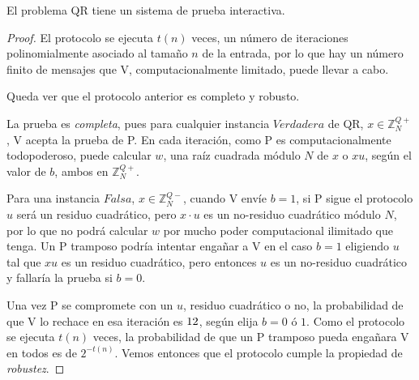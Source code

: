 \hfil


\begin{theorem}
	El problema QR tiene un sistema de prueba interactiva.
	\label{theo:QRint}
\end{theorem}

\begin{proof}
	
	El protocolo se ejecuta $t(n)$ veces, un número de iteraciones polinomialmente asociado al tamaño $n$ de la entrada, por lo que hay un número finito de mensajes que V, computacionalmente limitado, puede llevar a cabo. 
	
	\hfil 
	
	Queda ver que el protocolo anterior es completo y robusto.
	
	La prueba es \textit{completa}, pues para cualquier instancia $Verdadera$ de QR, $x \in \mathbb{Z}^{Q+}_N$, V acepta la prueba de P. En cada iteración, como P es computacionalmente todopoderoso, puede calcular $w$, una raíz cuadrada módulo $N$ de $x$ o $xu$, según el valor de $b$, ambos en $\mathbb{Z}^{Q+}_N$.
	
	Para una instancia $Falsa$, $x \in \mathbb{Z}^{Q-}_N$, cuando V envíe $b=1$, si P sigue el protocolo $u$ será un residuo cuadrático, pero $x\cdot u$ es un no-residuo cuadrático módulo $N$, por lo que no podrá calcular $w$ por mucho poder computacional ilimitado que tenga. Un P tramposo podría intentar engañar a V en el caso $b = 1$ eligiendo $u$ tal que $xu$ es un residuo cuadrático, pero entonces $u$ es un no-residuo cuadrático y fallaría la prueba si $b=0$.
	
	Una vez P se compromete con un $u$, residuo cuadrático o no, la probabilidad de que V lo rechace en esa iteración es $1\/2$, según elija $b=0$ ó $1$. Como el protocolo se ejecuta $t(n)$ veces, la probabilidad de que un P tramposo pueda engañara V en todos es de $2^{-t(n)}$. Vemos entonces que el protocolo cumple la propiedad de \textit{robustez}.
\end{proof}




